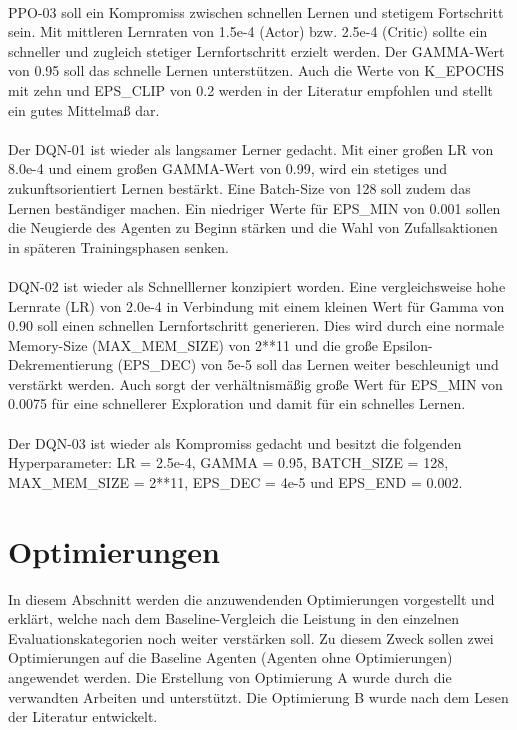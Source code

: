 \\PPO-03 soll ein Kompromiss zwischen schnellen Lernen und stetigem Fortschritt sein. Mit mittleren Lernraten von 1.5e-4 (Actor) bzw. 2.5e-4 (Critic) sollte ein schneller und zugleich stetiger Lernfortschritt erzielt werden. Der GAMMA-Wert von 0.95 soll das schnelle Lernen unterstützen. Auch die Werte von K\_EPOCHS mit zehn und EPS\_CLIP von 0.2 werden in der Literatur \cite[Anhang A]{PPO} empfohlen und stellt ein gutes Mittelmaß dar.\\
\\Der DQN-01 ist wieder als langsamer Lerner gedacht. Mit einer großen LR von 8.0e-4 und einem großen GAMMA-Wert von 0.99, wird ein stetiges und zukunftsorientiert Lernen bestärkt. Eine Batch-Size von 128 soll zudem das Lernen beständiger machen. Ein niedriger Werte für EPS\_MIN von 0.001 sollen die Neugierde des Agenten zu Beginn stärken und die Wahl von Zufallsaktionen in späteren Trainingsphasen senken.\\
\\DQN-02 ist wieder als Schnelllerner konzipiert worden. Eine vergleichsweise hohe Lernrate (LR) von 2.0e-4 in Verbindung mit einem kleinen Wert für Gamma von 0.90 soll einen schnellen Lernfortschritt generieren. Dies wird durch eine normale Memory-Size (MAX\_MEM\_SIZE) von 2**11 und die große Epsilon-Dekrementierung (EPS\_DEC) von 5e-5 soll das Lernen weiter beschleunigt und verstärkt werden. Auch sorgt der verhältnismäßig große Wert für EPS\_MIN von 0.0075 für eine schnellerer Exploration und damit für ein schnelles Lernen.\\
\\Der DQN-03 ist wieder als Kompromiss gedacht und besitzt die folgenden Hyperparameter: 
LR = 2.5e-4, GAMMA = 0.95, BATCH\_SIZE = 128, 
MAX\_MEM\_SIZE = 2**11, EPS\_DEC = 4e-5 und EPS\_END = 0.002.

\section{Optimierungen}
In diesem Abschnitt werden die anzuwendenden Optimierungen vorgestellt und erklärt, welche nach dem Baseline-Vergleich die Leistung in den einzelnen Evaluationskategorien noch weiter verstärken soll. Zu diesem Zweck sollen zwei Optimierungen auf die Baseline Agenten (Agenten ohne Optimierungen) angewendet werden. Die Erstellung von Optimierung A wurde durch die verwandten Arbeiten \cite{UAV} und \cite{Autonomous_Agents_in_Snake_Game_via_DRL} unterstützt. Die Optimierung B wurde nach dem Lesen der Literatur \cite[S. 331 f.]{DRL_Lapan} entwickelt.\\

